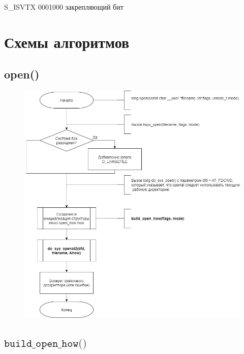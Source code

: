 \documentclass[a4paper,14pt]{extreport}
\begin{document}
S\_ISVTX  0001000 закрепляющий бит 






\chapter{Схемы алгоритмов}

\section{open()}

\begin{figure}[H]
	\centering
	\includegraphics[scale=0.6]{img/open1.jpg}
\end{figure}




\clearpage
\section{$\texttt{build\_open\_how()}$}
\end{document}
